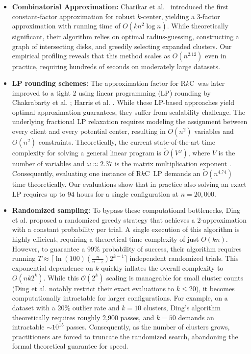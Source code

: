 \documentclass[twoside,leqno,twocolumn]{article}
\newcommand{\rkc}{R$k$C}
\newcommand{\N}{n}
\begin{document}
\begin{itemize}
     \item \textbf{Combinatorial Approximation:} Charikar et al.~\cite{charikar2001} introduced the first constant-factor approximation for robust $k$-center, yielding a 3-factor approximation with running time of $O(kn^2\log n)$. While theoretically significant, their algorithm relies on optimal radius-guessing, constructing a graph of intersecting disks, and greedily selecting expanded clusters. Our empirical profiling reveals that this method scales as $O(n^{2.12})$ even in practice, requiring hundreds of seconds on moderately large datasets.

    \item \textbf{LP rounding schemes:} The approximation factor for \rkc~was later improved to a tight 2 using linear programming (LP) rounding by Chakrabarty et al. \cite{chakrabarty2016non}; Harris et al. \cite{harris2017lottery}. While these LP-based approaches yield optimal approximation guarantees, they suffer from scalability challenge. The underlying fractional LP relaxation requires modeling the assignment between every client and every potential center, resulting in $O(n^2)$ variables and $O(n^2)$ constraints. Theoretically, the current state-of-the-art time complexity for solving a general linear program is $\tilde{O}(V^\omega)$, where $V$ is the number of variables and $\omega \approx 2.37$ is the matrix multiplication exponent \cite{cohen2021solving}. Consequently, evaluating one instance of \rkc~LP demands an $\tilde{O}(n^{4.74})$ time theoretically. Our evaluations show that in practice also solving an exact LP requires up to 94 hours for a single configuration at $\N=20,000$.

    \item \textbf{Randomized sampling:} To bypass these computational bottlenecks, Ding et al. \cite{ding2019} proposed a randomized greedy strategy that achieves a $2$-approximation with a constant probability per trial. A single execution of this algorithm is highly efficient, requiring a theoretical time complexity of just $O(kn)$. However, to guarantee a 99\% probability of success, their algorithm requires running $T \approx \lceil \ln(100) (\frac{n}{n-z})  2^{k-1} \rceil$ independent randomized trials. This exponential dependence on $k$ quickly inflates the overall complexity to $O(nk2^k)$. While this $\mathcal{O}(2^k)$ scaling is manageable for small cluster counts (Ding et al. notably restrict their exact evaluations to $k \le 20$), it becomes computationally intractable for larger configurations. For example, on a dataset with a 20\% outlier rate and $k=10$ clusters, Ding's algorithm theoretically requires roughly 2,900 passes, and $k=50$ demands an intractable $\sim 10^{15}$ passes. Consequently, as the number of clusters grows, practitioners are forced to truncate the randomized search, abandoning the formal theoretical guarantee for speed.


\end{itemize}
\end{document}

